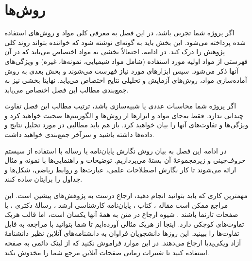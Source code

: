 \chapter{روش‌ها}
اگر پروژه شما تجربی باشد، در این فصل به معرفی کلی مواد و روش‌های استفاده شده پرداخته می‌شود. این بخش باید به گونه‌ای نوشته شود که خواننده بتواند روند کلی پژوهش را درک کند. در ادامه، احتمالاً بخشی به مواد اختصاص می‌یابد که در آن فهرستی از مواد اولیه مورد استفاده (شامل مواد شیمیایی، نمونه‌ها، غیره) و ویژگی‌های آنها ذکر می‌شود. سپس ابزارهای مورد نیاز فهرست می‌شوند و بخش بعدی به روش آماده‌سازی مواد، روش‌های آزمایش و تحلیلی نتایج  اختصاص می‌یابد. نهایتا بخشی نیز به جمع‌بندی مطالب این فصل اختصاص می‌یابد.

اگر پروژه شما محاسبات عددی یا شبیه‌سازی باشد، ترتیب مطالب این فصل تفاوت چندانی ندارد. فقط به‌جای مواد و ابزارها از روش‌ها و الگوریتم‌ها صحبت خواهید کرد و ویژگی‌ها و تفاوت‌های آنها را بیان خواهید کرد. باز هم باید مطالبی در مورد تحلیل نتایج و داده‌ها داشته باشید و سرآخر جمع‌بندی خواهید داشت.

در ادامه این فصل به بیان روش نگارش پایان‌نامه یا رساله با استفاده از سیستم حروف‌چینی 
\xelatex\LTRfootnote{\XeLaTeX} 
و زیرمجموعهٔ آن بستهٔ 
\xepersian\LTRfootnote{\XePersian} 
می‌پردازیم. توضیحات و راهنمایی‌ها با نمونه و مثال ارائه می‌شوند تا کار نگارش اصطلاحات علمی، عبارت‌ها و روابط ریاضی، شکل‌ها و جداول را برایتان ساده کنند. 

مهمترین کاری که باید بتوانید انجام دهید، ارجاع درست به پژوهش‌های پیشین است. این مراجع ممکن است مقاله 
\cite{myers2013improving}، 
کتاب 
\cite{willey2008prescott}، 
پایان‌نامه کارشناسی ارشد 
\cite{Iri}، 
رسالهٔ دکتری 
\cite{Mostafavi}، 
یا صفحات تارنما%
باشند 
\cite{thesis}. 
شیوه ارجاع در متن به همهٔ آنها یکسان است، اما قالب هریک تفاوت‌های کوچکی دارد. اینجا از هریک مثالی آورده‌ایم تا شما بتوانید با مراجعه به فایل 
تفاوت‌ها را ببینید. این روزها دانشجویان فراوان به دانشنامه‌های آنلاین نظیر دانشنامهٔ آزاد ویکی‌پدیا ارجاع می‌دهند. در این موارد فراموش نکنید که از لینک دائمی به صفحه استفاده کنید تا تغییرات زمانی صفحات آنلاین مرجع شما را مخدوش نکند.

